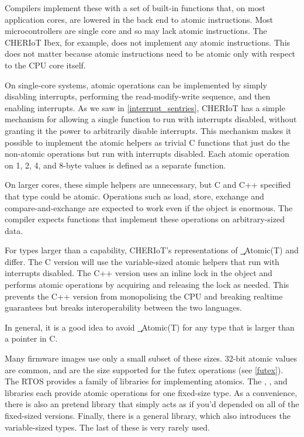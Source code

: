 Compilers implement these with a set of built-in functions that, on most application cores, are lowered in the back end to atomic instructions.
Most microcontrollers are single core and so may lack atomic instructions.
The CHERIoT Ibex, for example, does not implement any atomic instructions.
This does not matter because atomic instructions need to be atomic only with respect to the CPU core itself.

On single-core systems, atomic operations can be implemented by simply disabling interrupts, performing the read-modify-write sequence, and then enabling interrupts.
As we saw in \ref{interrupt_sentries}, CHERIoT has a simple mechanism for allowing a single function to run with interrupts disabled, without granting it the power to arbitrarily disable interrupts.
This mechanism makes it possible to implement the atomic helpers as trivial C functions that just do the non-atomic operations but run with interrupts disabled.
Each atomic operation on 1, 2, 4, and 8-byte values is defined as a separate function.

On larger cores, these simple helpers are unnecessary, but C and C++ specified that  type could be atomic.
Operations such as load, store, exchange and compare-and-exchange are expected to work even if the object is enormous.
The compiler expects functions that implement these operations on arbitrary-sized data.

\begin{caution}
For types larger than a capability, CHERIoT's representations of \c{_Atomic(T)} and  differ.
The C version will use the variable-sized atomic helpers that run with interrupts disabled.
The C++ version uses an inline lock in the object and performs atomic operations by acquiring and releasing the lock as needed.
This prevents the C++ version from monopolising the CPU and breaking realtime guarantees but breaks interoperability between the two languages.

In general, it is a good idea to avoid \c{_Atomic(T)} for any type that is larger than a pointer in C.
\end{caution}

Many firmware images use only a small subset of these sizes.
32-bit atomic values are common, and are the size supported for the futex operations (see \ref{futex}).
The RTOS provides a family of libraries for implementing atomics.
The , ,  and  libraries each provide atomic operations for one fixed-size type.
As a convenience, there is also an  pretend library that simply acts as if you'd depended on all of the fixed-sized versions.
Finally, there is a general  library, which also introduces the variable-sized types.
The last of these is very rarely used.

